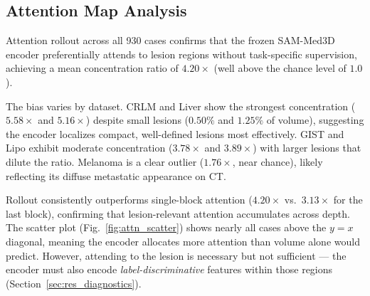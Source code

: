 \subsection{Attention Map Analysis}\label{sec:res_attention}

Attention rollout across all 930 cases confirms that the frozen SAM-Med3D
encoder preferentially attends to lesion regions without task-specific
supervision, achieving a mean concentration ratio of $4.20\times$ (well
above the chance level of $1.0$).

The bias varies by dataset. CRLM and Liver show the strongest concentration
($5.58\times$ and $5.16\times$) despite small lesions ($0.50\%$ and $1.25\%$
of volume), suggesting the encoder localizes compact, well-defined lesions
most effectively. GIST and Lipo exhibit moderate concentration ($3.78\times$
and $3.89\times$) with larger lesions that dilute the ratio. Melanoma is a
clear outlier ($1.76\times$, near chance), likely reflecting its diffuse
metastatic appearance on CT.

Rollout consistently outperforms single-block attention ($4.20\times$ vs.\
$3.13\times$ for the last block), confirming that lesion-relevant attention
accumulates across depth. The scatter plot
(Fig.~\ref{fig:attn_scatter}) shows nearly all cases above the $y{=}x$
diagonal, meaning the encoder allocates more attention than volume alone
would predict. However, attending to the lesion is necessary but not
sufficient — the encoder must also encode \emph{label-discriminative}
features within those regions (Section~\ref{sec:res_diagnostics}).
